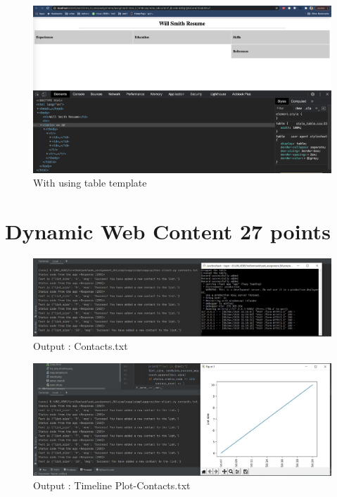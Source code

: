 \documentclass{resources/WeSTassignment}
\begin{document}
\begin{figure}[h]
   		\centering
   		\includegraphics[scale=1.0,width=\linewidth]{html_css/table.png}
   		\caption{With using table template}
   		\label{fig: With using table template}
	\end{figure}

\section{Dynamic Web Content \hfill{27 points}}

	   \begin{figure}[ht]
    			\centering
    			\includegraphics[scale=0.4]{resources/finalContactsServer.JPG}
    			\caption{Output : Contacts.txt}
    			\label{fig:contacts.txt}
\end{figure}

		\begin{figure}[ht]
    			\centering
    			\includegraphics[scale=0.4]{resources/finalContactstimeline.JPG}
    			\caption{Output : Timeline Plot-Contacts.txt}
    			\label{fig:Timeline Plot Contacts.txt}
\end{figure}
\end{document}
